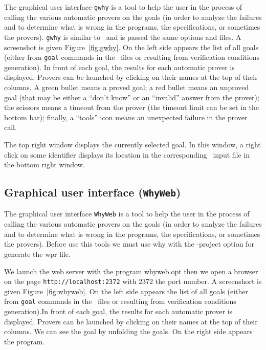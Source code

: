 \documentclass[a4paper,12pt]{report}
\begin{document}
The graphical user interface \texttt{gwhy} is a tool to help the user
in the process of calling the various automatic provers on the goals
(in order to analyze the failures and to determine what is wrong in
the programs, the specifications, or sometimes the provers).
\texttt{gwhy} is similar to \why\
and is passed the same options and files. A screenshot is given
Figure~\ref{fig:gwhy}. On the left side appears the list of all goals
(either from \texttt{goal} commands in the \why\ files or resulting
from verification conditions generation). In front of each goal, the
results for each automatic prover is displayed. Provers can be
launched by clicking on their names at the top of their columns.
A green bullet means a proved goal; a red bullet means an unproved
goal (that may be either a ``don't know'' or an ``invalid'' answer
from the prover); the scissors means a timeout from the prover (the
timeout limit can be set in the bottom bar); finally, a ``tools'' icon
means an unexpected failure in the prover call.

The top right window displays the currently selected goal.
In this window, a right click on some identifier displays its location
in the corresponding \why\ input file in the bottom right window.


\subsection{Graphical user interface (\texttt{WhyWeb})}

The graphical user interface \texttt{WhyWeb} is a tool to help the user
in the process of calling the various automatic provers on the goals
(in order to analyze the failures and to determine what is wrong in
the programs, the specifications, or sometimes the provers).
Before use this tools we must use why with the -project option for
generate the wpr file. 

We launch the web server with the program whyweb.opt then we open a
browser on the page \texttt{http://localhost:2372} with 2372 the port
number. A screenshort is given Figure~\ref{fig:whyweb}.  On the left
side appears the list of all goals (either from \texttt{goal} commands
in the \why\ files or resulting from verification conditions
generation).In front of each goal, the results for each automatic
prover is displayed. Provers can be launched by clicking on their
names at the top of their columns. We can see the goal by unfolding
the goals. On the right side appears the program.
\end{document}
